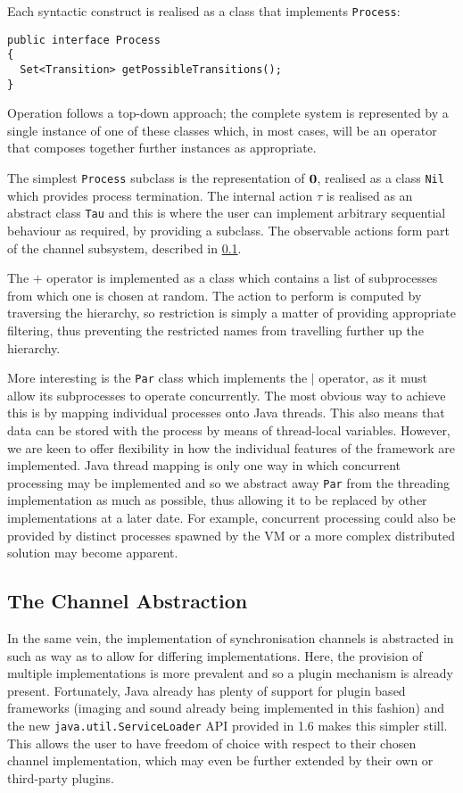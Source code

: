 Each syntactic construct is realised as a class that implements \texttt{Process}:

\begin{verbatim}
public interface Process
{
  Set<Transition> getPossibleTransitions();
}
\end{verbatim}

Operation follows a top-down approach; the complete system is
represented by a single instance of one of these classes which, in
most cases, will be an operator that composes together further
instances as appropriate.

The simplest \texttt{Process} subclass is the representation of $\textbf{0}$,
realised as a class \texttt{Nil} which provides process termination.
The internal action $\tau$ is realised as an abstract class \texttt{Tau}
and this is where the user can implement arbitrary sequential behaviour
as required, by providing a subclass. The observable actions form part
of the channel subsystem, described in \ref{dyn:channels}.

The $+$ operator is implemented as a class which contains a list of
subprocesses from which one is chosen at random.  The action to perform
is computed by traversing the hierarchy, so restriction is simply a
matter of providing appropriate filtering, thus preventing the
restricted names from travelling further up the hierarchy.

More interesting is the \texttt{Par} class which implements the $\mid$
operator, as it must allow its subprocesses to operate concurrently.
The most obvious way to achieve this is by mapping individual processes
onto Java threads.  This also means that data can be stored with the
process by means of thread-local variables.  However, we are keen to
offer flexibility in how the individual features of the framework are
implemented.  Java thread mapping is only one way in which concurrent
processing may be implemented and so we abstract away \texttt{Par} from
the threading implementation as much as possible, thus allowing it to be
replaced by other implementations at a later date.  For example,
concurrent processing could also be provided by distinct processes
spawned by the VM or a more complex distributed solution may become
apparent.

\subsection{The Channel Abstraction}
\label{dyn:channels}

In the same vein, the implementation of synchronisation channels is
abstracted in such as way as to allow for differing implementations.
Here, the provision of multiple implementations is more prevalent and so
a plugin mechanism is already present.  Fortunately, Java already has
plenty of support for plugin based frameworks (imaging and sound already
being implemented in this fashion) and the new
\texttt{java.util.ServiceLoader} API provided in 1.6 makes this simpler
still.  This allows the user to have freedom of choice with respect to
their chosen channel implementation, which may even be further extended
by their own or third-party plugins.


